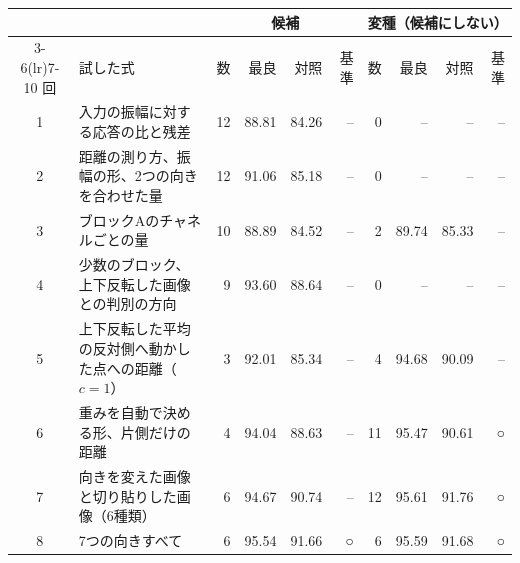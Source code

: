 \documentclass[border=3pt]{standalone}
\begin{document}
%
\begin{tabular}{cl*{4}{r}*{4}{r}}%
\toprule
 & & \multicolumn{4}{c}{候補} & \multicolumn{4}{c}{変種（候補にしない）}\\
\cmidrule(lr){3-6}\cmidrule(lr){7-10}
回 & 試した式 & 数 & 最良 & 対照 & 基準 & 数 & 最良 & 対照 & 基準\\
\midrule
1 & 入力の振幅に対する応答の比と残差 & 12 & 88.81 & 84.26 & – & 0 & – & – & –\\
2 & 距離の測り方、振幅の形、2つの向きを合わせた量 & 12 & 91.06 & 85.18 & – & 0 & – & – & –\\
3 & ブロックAのチャネルごとの量 & 10 & 88.89 & 84.52 & – & 2 & 89.74 & 85.33 & –\\
4 & 少数のブロック、上下反転した画像との判別の方向 & 9 & 93.60 & 88.64 & – & 0 & – & – & –\\
5 & 上下反転した平均の反対側へ動かした点への距離（$c=1$） & 3 & 92.01 & 85.34 & – & 4 & 94.68 & 90.09 & –\\
6 & 重みを自動で決める形、片側だけの距離 & 4 & 94.04 & 88.63 & – & 11 & 95.47 & 90.61 & ○\\
7 & 向きを変えた画像と切り貼りした画像（6種類） & 6 & 94.67 & 90.74 & – & 12 & 95.61 & 91.76 & ○\\
8 & 7つの向きすべて & 6 & 95.54 & 91.66 & ○ & 6 & 95.59 & 91.68 & ○\\
\bottomrule
\end{tabular}%
\end{document}

